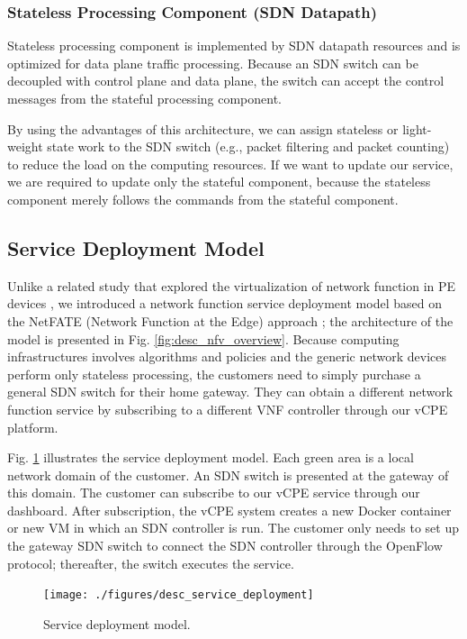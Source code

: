 \documentclass[conference]{IEEEtran}
\begin{document}
\subsubsection{Stateless Processing Component (SDN Datapath)}
Stateless processing component is implemented by SDN datapath resources and is optimized for data plane traffic processing. Because an SDN switch can be decoupled with control plane and data plane, the switch can accept the control messages from the stateful processing component.

By using the advantages of this architecture, we can assign stateless or light-weight state work to the SDN switch (e.g., packet filtering and packet counting) to reduce the load on the computing resources. If we want to update our service, we are required to update only the stateful component, because the stateless component merely follows the commands from the stateful component.

\subsection{Service Deployment Model}
Unlike a related study that explored the virtualization of network function in PE devices \cite{vcpe-enhance}, we introduced a network function service deployment model based on the NetFATE (Network Function at the Edge) approach \cite{netfate}; the architecture of the model is presented in Fig. \ref{fig:desc_nfv_overview}. Because computing infrastructures involves algorithms and policies and the generic network devices perform only stateless processing, the customers need to simply purchase a general SDN switch for their home gateway. They can obtain a different network function service by subscribing to a different VNF controller through our vCPE platform.

Fig. \ref{fig:desc_service_deployment} illustrates the service deployment model. Each green area is a local network domain of the customer. An SDN switch is presented at the gateway of this domain. The customer can subscribe to our vCPE service through our dashboard. After subscription, the vCPE system creates a new Docker container or new VM in which an SDN controller is run. The customer only needs to set up the gateway SDN switch to connect the SDN controller through the OpenFlow protocol; thereafter, the switch executes the service.

\begin{figure}[!t]
\centering
\texttt{[image: ./figures/desc\_service\_deployment]}
\caption{Service deployment model.}
\label{fig:desc_service_deployment}
\end{figure}
\end{document}
